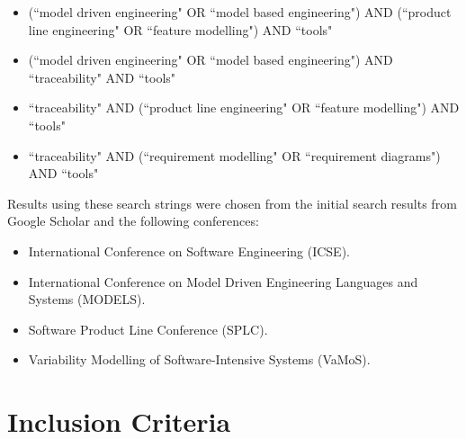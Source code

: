 \begin{itemize}
	\item (``model driven engineering" OR ``model based engineering") AND (``product line engineering" OR ``feature modelling") AND ``tools"
	\item (``model driven engineering" OR ``model based engineering") AND ``traceability" AND ``tools"
	\item ``traceability" AND (``product line engineering" OR ``feature modelling") AND ``tools"
	\item ``traceability" AND (``requirement modelling" OR ``requirement diagrams") AND ``tools"
\end{itemize}

Results using these search strings were chosen from the initial search results from Google Scholar and the following conferences:
\begin{itemize}
	\item International Conference on Software Engineering (ICSE). 
	\item International Conference on Model Driven Engineering Languages and Systems (MODELS). 
	\item Software Product Line Conference (SPLC).
	\item Variability Modelling of Software-Intensive Systems (VaMoS).
\end{itemize}

\section{Inclusion Criteria}


